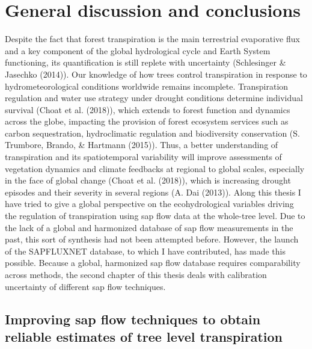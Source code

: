 \documentclass[11pt,twoside]{reedthesis}
\begin{document}
\chapter[General discussion and conclusions]{General discussion and conclusions}

\setlength{\parskip}{0.2cm plus4mm minus3mm}

\newpage

\setlength{\parindent}{0pt} Despite the fact that forest transpiration
is the main terrestrial evaporative flux and a key component of the
global hydrological cycle and Earth System functioning, its
quantification is still replete with uncertainty (Schlesinger \&
Jasechko (2014)). Our knowledge of how trees control transpiration in
response to hydrometeorological conditions worldwide remains incomplete.
Transpiration regulation and water use strategy under drought conditions
determine individual survival (Choat et al. (2018)), which extends to
forest function and dynamics across the globe, impacting the provision
of forest ecosystem services such as carbon sequestration, hydroclimatic
regulation and biodiversity conservation (S. Trumbore, Brando, \&
Hartmann (2015)). Thus, a better understanding of transpiration and its
spatiotemporal variability will improve assessments of vegetation
dynamics and climate feedbacks at regional to global scales, especially
in the face of global change (Choat et al. (2018)), which is increasing
drought episodes and their severity in several regions (A. Dai (2013)).
Along this thesis I have tried to give a global perspective on the
ecohydrological variables driving the regulation of transpiration using
sap flow data at the whole-tree level. Due to the lack of a global and
harmonized database of sap flow measurements in the past, this sort of
synthesis had not been attempted before. However, the launch of the
SAPFLUXNET database, to which I have contributed, has made this
possible. Because a global, harmonized sap flow database requires
comparability across methods, the second chapter of this thesis deals
with calibration uncertainty of different sap flow techniques. \par

\section{Improving sap flow techniques to obtain reliable estimates of
tree level
transpiration}\label{improving-sap-flow-techniques-to-obtain-reliable-estimates-of-tree-level-transpiration}
\end{document}

